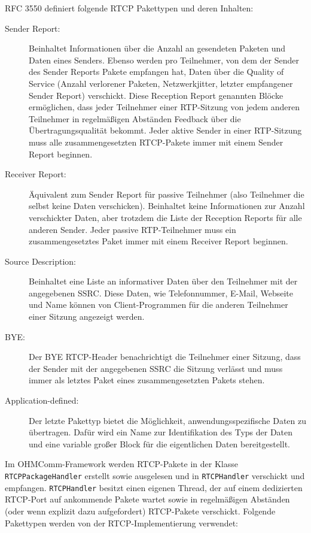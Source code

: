RFC 3550 definiert folgende RTCP Pakettypen und deren Inhalten:
\begin{description}
\item[Sender Report:] Beinhaltet Informationen über die Anzahl an gesendeten Paketen und Daten eines Senders. Ebenso werden pro Teilnehmer, von dem der Sender des Sender Reports Pakete empfangen hat, Daten über die Quality of Service (Anzahl verlorener Paketen, Netzwerkjitter, letzter empfangener Sender Report) verschickt. Diese Reception Report genannten Blöcke ermöglichen, dass jeder Teilnehmer einer RTP-Sitzung von jedem anderen Teilnehmer in regelmäßigen Abständen Feedback über die Übertragungsqualität bekommt. Jeder aktive Sender in einer RTP-Sitzung muss alle zusammengesetzten RTCP-Pakete immer mit einem Sender Report beginnen.
\item[Receiver Report:] Äquivalent zum Sender Report für passive Teilnehmer (also Teilnehmer die selbst keine Daten verschicken). Beinhaltet keine Informationen zur Anzahl verschickter Daten, aber trotzdem die Liste der Reception Reports für alle anderen Sender. Jeder passive RTP-Teilnehmer muss ein zusammengesetztes Paket immer mit einem Receiver Report beginnen.
\item[Source Description:] Beinhaltet eine Liste an informativer Daten über den Teilnehmer mit der angegebenen SSRC. Diese Daten, wie Telefonnummer, E-Mail, Webseite und Name können von Client-Programmen für die anderen Teilnehmer einer Sitzung angezeigt werden.
\item[BYE:] Der BYE RTCP-Header benachrichtigt die Teilnehmer einer Sitzung, dass der Sender mit der angegebenen SSRC die Sitzung verlässt und muss immer als letztes Paket eines zusammengesetzten Pakets stehen.
\item[Application-defined:] Der letzte Pakettyp bietet die Möglichkeit, anwendungsspezifische Daten zu übertragen. Dafür wird ein Name zur Identifikation des Typs der Daten und eine variable großer Block für die eigentlichen Daten bereitgestellt.
\end{description}
Im OHMComm-Framework werden RTCP-Pakete in der Klasse \texttt{RTCPPackageHandler} erstellt sowie ausgelesen und in \texttt{RTCPHandler} verschickt und empfangen. \texttt{RTCPHandler} besitzt einen eigenen Thread, der auf einem dedizierten RTCP-Port auf ankommende Pakete wartet sowie in regelmäßigen Abständen (oder wenn explizit dazu aufgefordert) RTCP-Pakete verschickt. Folgende Pakettypen werden von der RTCP-Implementierung verwendet:
\\
